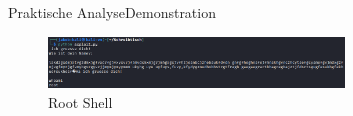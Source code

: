 \begin{frame}{Praktische Analyse}{Demonstration}
    \begin{figure}[h]
        \centering
        \includegraphics[width=0.7\textwidth,height=0.75\textheight,keepaspectratio]{images/root.png}
        \caption{Root Shell}
    \end{figure}
\end{frame}

